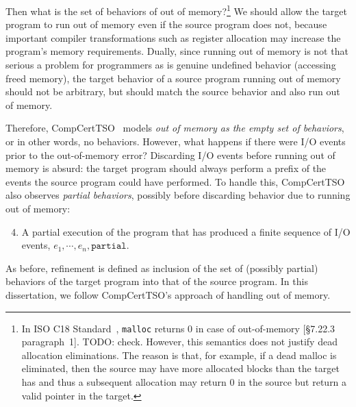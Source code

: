 Then what is the set of behaviors of out of memory?\footnote{In ISO C18 Standard~\cite{iso2018iec},
  \texttt{malloc} returns $0$ in case of out-of-memory [\S7.22.3 paragraph~1].  TODO: check.
  However, this semantics does not justify dead allocation eliminations.  The reason is that, for
  example, if a dead malloc is eliminated, then the source may have more allocated blocks than the
  target has and thus a subsequent allocation may return 0 in the source but return a valid pointer
  in the target.}
We should allow the target program to run out of memory even if the source program does not, because
important compiler transformations such as register allocation may increase the program's memory
requirements.  Dually, since running out of memory is not that serious a problem for programmers as
is genuine undefined behavior (\eg accessing freed memory), the target behavior of a source program
running out of memory should not be arbitrary, but should match the source behavior and also run out
of memory.

Therefore, CompCertTSO~\cite{vsevvcik2013compcerttso} models \emph{out of memory as the empty set of
  behaviors}, or in other words, no behaviors.  However, what happens if there were I/O events prior
to the out-of-memory error?  Discarding I/O events before running out of memory is absurd: the
target program should always perform a prefix of the events the source program could have performed.
To handle this, CompCertTSO also observes \emph{partial behaviors}, possibly before discarding
behavior due to running out of memory:
\begin{enumerate}
\setcounter{enumi}{3}
\item A partial execution of the program that has produced a finite sequence
of I/O events, $e_1, \cdots, e_n, \mathtt{partial}$.
\end{enumerate}
As before, refinement is defined as inclusion of the set of (possibly partial) behaviors of the
target program into that of the source program.  In this dissertation, we follow CompCertTSO's
approach of handling out of memory.


